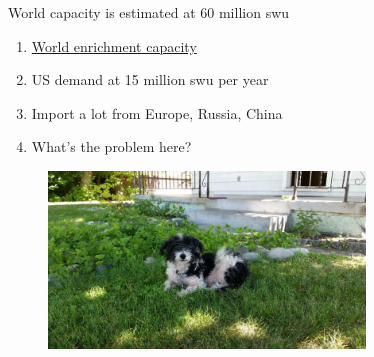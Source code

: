 \documentclass[aspectratio=1610,pdftex,dvipsnames,compress,xcolor={dvipsnames}]{beamer}
\newcommand{\acs}{\acrshort} %
\begin{document}
\begin{frame}{World capacity is estimated at 60 million \acs{swu}}
    \begin{enumerate}[topsep=0pt,itemsep=21pt,leftmargin=*,label=(\arabic*)]
        \item[]\href{http://www.world-nuclear.org/information-library/nuclear-fuel-cycle/conversion-enrichment-and-fabrication/uranium-enrichment.aspx}{World enrichment capacity}
        \item[]US demand at 15 million \acs{swu} per year
        \item[]Import a lot from Europe, Russia, China
        \item[]What's the problem here?
    \end{enumerate}
\end{frame}








\begin{frame}[plain]{}
    \begin{figure}
        \centering
        \includegraphics[width=0.75\textwidth]{final.jpg}
    \end{figure}
\end{frame}
\end{document}

